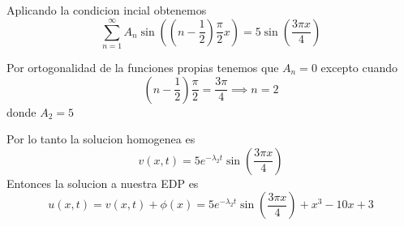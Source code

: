\message{ !name(MAT024.tex)}\documentclass[../main.tex]{subfiles}
\begin{document}
\begin{solution}
  Aplicando la condicion incial obtenemos
  \begin{equation*}
      \sum_{n = 1}^{\infty} A_{n}\sin((n - \frac12) \frac{\pi}{2}x) = 5 \sin(\frac{3\pi x}{4})
  \end{equation*}

  Por ortogonalidad de la funciones propias tenemos que $A_{n} = 0$ excepto cuando
  \begin{equation*}
    (n - \frac{1}{2})\frac{\pi}{2} = \frac{3\pi}{4} \implies n = 2
  \end{equation*}
  donde $A_{2} = 5$

  Por lo tanto la solucion homogenea es
  \begin{equation*}
    v(x, t) = 5 e^{-\lambda_{2} t}\sin(\frac{3 \pi x}{4})
  \end{equation*}
Entonces la solucion a nuestra EDP es
\begin{equation*}
  u(x, t) = v(x, t) + \phi(x) = 5 e^{-\lambda_{2} t}\sin(\frac{3 \pi x}{4}) + x^{3} - 10x + 3
\end{equation*}
\end{solution}
\end{document}
